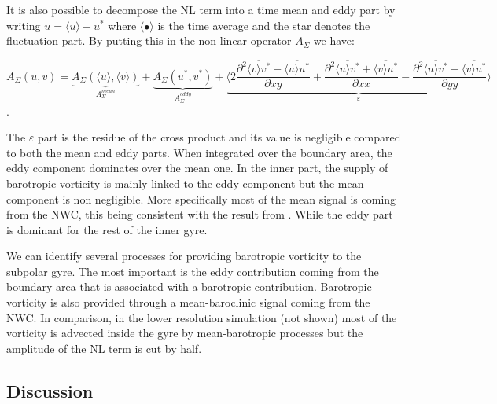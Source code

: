 \documentclass[11pt,a4paper]{article}
\begin{document}
It is also possible to decompose the NL term into a time mean and eddy part by writing $u = \langle u \rangle + u^*$ where $\langle \bullet\rangle$ is the time average and the star denotes the fluctuation part. By putting this in the non linear operator $A_{\Sigma}$ we have:


$$A_{\Sigma}(u,v)=\underbrace{A_{\Sigma}(\langle u \rangle, \langle v \rangle)}_{A_{\Sigma}^{mean}} + \underbrace{A_{\Sigma}(u^*,v^*)}_{A_{\Sigma}^{eddy}} +\underbrace{\langle  2\frac{\partial ^2 \overline{\langle v \rangle v^*} -\overline{\langle u \rangle u^*}}{\partial xy} +\frac{\partial ^2 \overline{\langle u \rangle v^*} + \overline{\langle v \rangle u^*}}{\partial xx} - \frac{\partial ^2 \overline{\langle u \rangle v^*} +\overline{ \langle v \rangle u^*}}{\partial yy}\rangle}_{\varepsilon}$$.


The $\varepsilon$ part is the residue of the cross product and its value is negligible compared to both the mean and eddy parts. When integrated over the boundary area, the eddy component dominates over the mean one. In the inner part, the supply of barotropic vorticity is mainly linked to the eddy component but the mean component is non negligible. More specifically most of the mean signal is coming from the NWC, this being consistent with the result from \citet{wang2017}. While the eddy part is dominant for the rest of the inner gyre.  %


We can identify several processes for providing barotropic vorticity to the subpolar gyre. The most important is the eddy contribution coming from the boundary area that is associated with a barotropic contribution. Barotropic vorticity is also provided through a mean-baroclinic signal coming from the NWC. In comparison, in the lower resolution simulation (not shown) most of the vorticity is advected inside the gyre by mean-barotropic processes but the amplitude of the NL term is cut by half.

\subsection{Discussion}
\end{document}
